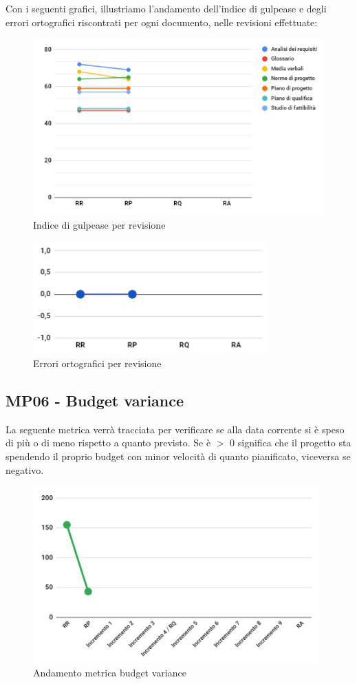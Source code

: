 \noindent Con i seguenti grafici, illustriamo l'andamento dell'indice di gulpease e degli errori ortografici riscontrati per ogni documento, nelle revisioni effettuate:
\begin{figure}[H]
	\centering
	\includegraphics[width=12cm]{images/gulpease.png}
	\caption{Indice di gulpease per revisione}
\end{figure}
\begin{figure}[H]
	\centering
	\includegraphics[width=9cm]{images/err_ortografici.png}
	\caption{Errori ortografici per revisione}
\end{figure}

\subsection{MP06 - Budget variance}
La seguente metrica verrà tracciata per verificare se alla data corrente si è speso di più o di meno rispetto a quanto previsto.
Se è $>$ 0 significa che il progetto sta spendendo il proprio budget con minor velocità di quanto pianificato, viceversa se negativo.
\begin{figure}[H]
	\centering
	\includegraphics[width=11cm]{images/budget_variance.png}
	\caption{Andamento metrica budget variance}
\end{figure}

